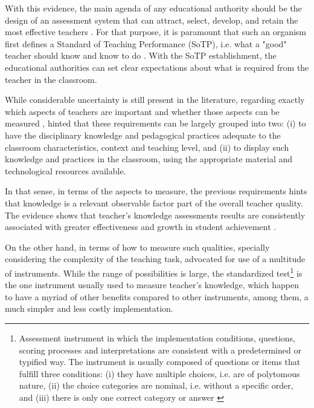 With this evidence, the main agenda of any educational authority should be the design of an assessment system that can attract, select, develop, and retain the most effective teachers \citep{Elacqua_et_al_2018}. For that purpose, it is paramount that such an organism first defines a Standard of Teaching Performance (SoTP), i.e. what a "good" teacher should know and know to do \citep{Hincapie_et_al_2020}. With the SoTP establishment, the educational authorities can set clear expectations about what is required from the teacher in the classroom. 

While considerable uncertainty is still present in the literature, regarding exactly which aspects of teachers are important and whether those aspects can be measured \citep{Rockoff_2004, Clotfelter_et_al_2006}, \citet{Hincapie_et_al_2020} hinted that these requirements can be largely grouped into two: (i) to have the disciplinary knowledge and pedagogical practices adequate to the classroom characteristics, context and teaching level, and (ii) to display such knowledge and practices in the classroom, using the appropriate material and technological resources available.

In that sense, in terms of the aspects to measure, the previous requirements hints that knowledge is a relevant observable factor part of the overall teacher quality. The evidence shows that teacher's knowledge assessments results are consistently associated with greater effectiveness and growth in student achievement \citep{Clotfelter_et_al_2006, Clotfelter_et_al_2007, Kane_et_al_2011, Kane_et_al_2012, Ome_2012, Metzler_et_al_2012, Kane_et_al_2013, Araujo_et_al_2016, Bietenbeck_et_al_2018, Estrada_2019}.

On the other hand, in terms of how to measure such qualities, specially considering the complexity of the teaching task, \citet{Bertoni_et_al_2020b} advocated for use of a multitude of instruments. While the range of possibilities is large, the standardized test\footnote{Assessment instrument in which the implementation conditions, questions, scoring processes and interpretations are consistent with a predetermined or typified way. The instrument is usually composed of questions or items that fulfill three conditions: (i) they have multiple choices, i.e. are of polytomous nature, (ii) the choice categories are nominal, i.e. without a specific order, and (iii) there is only one correct category or answer \citep{Rivera_2019}} is the one instrument usually used to measure teacher's knowledge, which happen to have a myriad of other benefits compared to other instruments, among them, a much simpler and less costly implementation.



